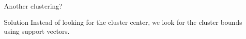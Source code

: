 \begin{frame}{Another clustering?}
\begin{block}{Solution}
Instead of looking for the cluster center, we look for the cluster bounds using support vectors. 
\end{block}
\end{frame}
